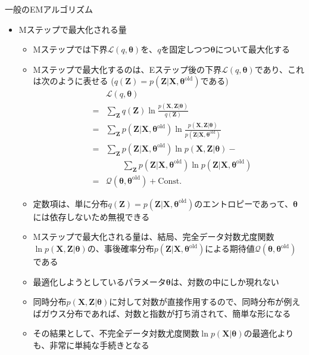 \documentclass[dvipdfmx,notheorems,t]{beamer}
\begin{document}
\begin{frame}{一般のEMアルゴリズム}

\begin{itemize}
	\item Mステップで最大化される量
	\begin{itemize}
		\item Mステップでは下界$\mathcal{L}(q, \bm{\theta})$を、$q$を固定しつつ$\bm{\theta}$について最大化する
		\item Mステップで最大化するのは、\alert{Eステップ後の下界}$\mathcal{L}(q, \bm{\theta})$であり、これは次のように表せる ($q(\bm{Z}) = p(\bm{Z} | \bm{X}, \bm{\theta}^\mathrm{old})$である)
		\begin{eqnarray}
			&& \mathcal{L}(q, \bm{\theta}) \nonumber \\
			&=& \sum_{\bm{Z}} q(\bm{Z}) \ln \frac{p(\bm{X}, \bm{Z} | \bm{\theta})}{q(\bm{Z})} \nonumber \\
			&=& \sum_{\bm{Z}} p(\bm{Z} | \bm{X}, \bm{\theta}^\mathrm{old}) \ln \frac{p(\bm{X}, \bm{Z} | \bm{\theta})}{p(\bm{Z} | \bm{X}, \bm{\theta}^\mathrm{old})} \\
			&=& \sum_{\bm{Z}} p(\bm{Z} | \bm{X}, \bm{\theta}^\mathrm{old}) \ln p(\bm{X}, \bm{Z} | \bm{\theta}) - \nonumber \\
			&& \qquad \sum_{\bm{Z}} p(\bm{Z} | \bm{X}, \bm{\theta}^\mathrm{old}) \ln p(\bm{Z} | \bm{X}, \bm{\theta}^\mathrm{old}) \\
			&=& \mathcal{Q}(\bm{\theta}, \bm{\theta}^\mathrm{old}) + \mathrm{Const.}
		\end{eqnarray}
		
		\item 定数項は、単に分布$q(\bm{Z}) = p(\bm{Z} | \bm{X}, \bm{\theta}^\mathrm{old})$のエントロピーであって、$\bm{\theta}$には依存しないため無視できる
		\newline
		\item Mステップで最大化される量は、結局、完全データ対数尤度関数$\ln p(\bm{X}, \bm{Z} | \bm{\theta})$の、事後確率分布$p(\bm{Z} | \bm{X}, \bm{\theta}^\mathrm{old})$による期待値\color{red}$\mathcal{Q}(\bm{\theta}, \bm{\theta}^\mathrm{old})$\normalcolor である
		\newline
		\item 最適化しようとしているパラメータ$\bm{\theta}$は、\alert{対数の中にしか現れない}
		\item 同時分布$p(\bm{X}, \bm{Z} | \bm{\theta})$に対して\alert{対数が直接作用}するので、同時分布が例えばガウス分布であれば、対数と指数が打ち消されて、簡単な形になる
		\newline
		\item その結果として、不完全データ対数尤度関数$\ln p(\bm{X} | \bm{\theta})$の最適化よりも、\alert{非常に単純な手続きとなる}
	\end{itemize}
\end{itemize}

\end{frame}
\end{document}
